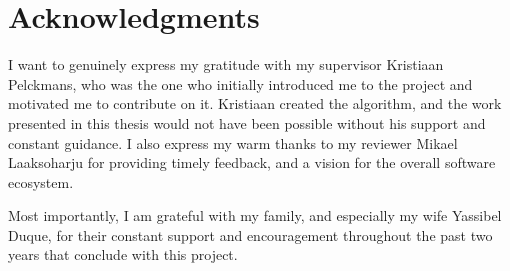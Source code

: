 \chapter{Acknowledgments} \label{ch:acknowledgments}

I want to genuinely express my gratitude with my supervisor Kristiaan Pelckmans, who was the one who initially introduced me to the \vasco project and motivated me to contribute on it. Kristiaan created the \mlblink algorithm, and the work presented in this thesis would not have been possible without his support and constant guidance. I also express my warm thanks to my reviewer Mikael Laaksoharju for providing timely feedback, and a vision for the overall \mlblink software ecosystem. \newline

Most importantly, I am grateful with my family, and especially my wife Yassibel Duque, for their constant support and encouragement throughout the past two years that conclude with this project.